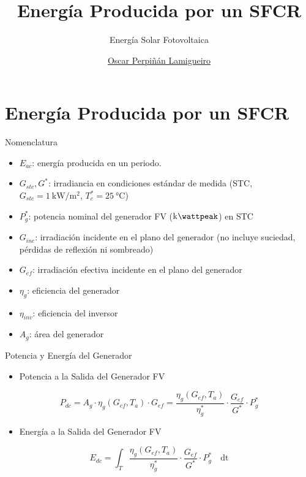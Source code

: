 \documentclass[aspectratio=169, usenames,svgnames,dvipsnames]{beamer}
\author{\href{https://oscarperpinan.github.io}{Oscar Perpiñán Lamigueiro}}
\date{}
\title{Energía Producida por un SFCR}
\subtitle{Energía Solar Fotovoltaica}
\institute[UPM]{Universidad Politécnica de Madrid}
\begin{document}
\maketitle

\section{Energía Producida por un SFCR}
\label{sec:org9ace565}

\begin{frame}[label={sec:orgd6d68a6}]{Nomenclatura}
\begin{itemize}
\item \(E_{ac}\): energía producida en un periodo.
\item \(G_{stc}, G^*\): irradiancia en condiciones estándar de medida (STC,
\(G_{stc}=\SI{1}{\kilo\watt\per\meter\squared}\),
\(T^*_c=\SI{25}{\celsius}\))
\item \(P_{g}^{*}\): potencia nominal del generador FV
(\(\si{\kilo\wattpeak}\)) en STC
\item \(G_{inc}\): irradiación incidente en el plano del
generador (no incluye suciedad, pérdidas de reflexión ni sombreado)
\item \(G_{ef}\): irradiación efectiva incidente en el plano del
generador
\item \(\eta_g\): eficiencia del generador
\item \(\eta_{inv}\): eficiencia del inversor
\item \(A_g\): área del generador
\end{itemize}
\end{frame}

\begin{frame}[label={sec:orgee47912}]{Potencia y Energía del Generador}
\begin{itemize}
\item \alert{Potencia} a la Salida del Generador FV
\end{itemize}
\[
  P_{dc} = A_g \cdot \eta_g(G_{ef}, T_a) \cdot  G_{ef} = %
  \frac{\eta_g(G_{ef}, T_a)}{\eta_g^*} \cdot \frac{G_{ef}}{G^*} \cdot P_g^*
\]

\begin{itemize}
\item \alert{Energía} a la Salida del Generador FV
\end{itemize}

\[
  E_{dc} = \int_T \frac{\eta_g(G_{ef}, T_a)}{\eta_g^*} \cdot
  \frac{G_{ef}}{G^*} \cdot P_g^*\quad \mathrm{dt}
\]
\end{frame}
\end{document}
